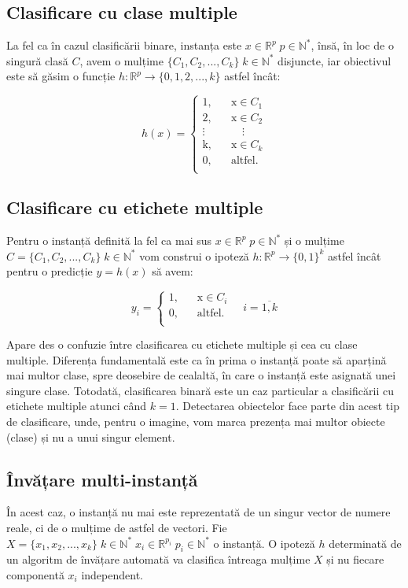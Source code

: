 \subsection{Clasificare cu clase multiple}
La fel ca în cazul clasificării binare, instanța este $x\in\mathbb{R}^p \; p\in\mathbb{N^*}$, însă, în loc de o singură clasă $C$, avem o mulțime $\{C_1,C_2,...,C_k\} \; k\in\mathbb{N^*}$ disjuncte, iar obiectivul este să găsim o funcție $h:\mathbb{R}^p\rightarrow\{0,1,2,...,k\}$ astfel încât:

\[
h(x)=
	\begin{cases}
		\text{1,} &\quad\text{x}\in\text{$C_1$} \\
		\text{2,} &\quad\text{x}\in\text{$C_2$} \\
		\vdots &\quad\quad\vdots \\
		\text{k,} &\quad\text{x}\in\text{$C_k$} \\
		\text{0,} &\quad\text{altfel.} \\
	\end{cases}
\]

\subsection{Clasificare cu etichete multiple}
Pentru o instanță definită la fel ca mai sus $x\in\mathbb{R}^p \; p\in\mathbb{N^*}$ și o mulțime $C=\{C_1,C_2,...,C_k\} \; k\in\mathbb{N^*}$ vom construi o ipoteză $h:\mathbb{R}^p\rightarrow\{0, 1\}^k$ astfel încât pentru o predicție $y=h(x)$ să avem:

\[
y_i=
	\begin{cases}
		\text{1,} &\quad\text{x}\in\text{$C_i$} \\
		\text{0,} &\quad\text{altfel.} \\
	\end{cases}
\quad i=\overline{1,k}
\]

Apare des o confuzie între clasificarea cu etichete multiple și cea cu clase multiple. Diferența fundamentală este ca în prima o instanță poate să aparțină mai multor clase, spre deosebire de cealaltă, în care o instanță este asignată unei singure clase. Totodată, clasificarea binară este un caz particular a clasificării cu etichete multiple atunci când $k=1$. Detectarea obiectelor face parte din acest tip de clasificare, unde, pentru o imagine, vom marca prezența mai multor obiecte (clase) și nu a unui singur element.

\subsection{Învățare multi-instanță}
În acest caz, o instanță nu mai este reprezentată de un singur vector de numere reale, ci de o mulțime de astfel de vectori. Fie $X=\{x_1, x_2,...,x_k\} \; k\in\mathbb{N^*} \; x_i\in\mathbb{R}^{p_i} \; p_i\in\mathbb{N^*}$ o instanță. O ipoteză $h$ determinată de un algoritm de învățare automată va clasifica întreaga mulțime $X$ și nu fiecare componentă $x_i$ independent.   \cite{multiInstance}\\

